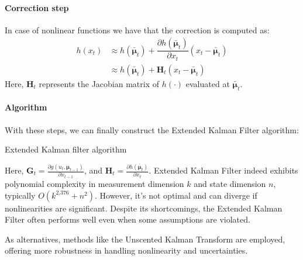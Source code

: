 \paragraph*{Correction step}
In case of nonlinear functions we have that the correction is computed as: 
\begin{align*}
    h(x_t)  &\approx h(\bar{\boldsymbol{\mu}}_t)+\dfrac{\partial h(\bar{\boldsymbol{\mu}}_t)}{\partial x_t}(x_t-\bar{\boldsymbol{\mu}}_t) \\
            &\approx h(\bar{\boldsymbol{\mu}}_t)+\mathbf{H}_t(x_t-\bar{\boldsymbol{\mu}}_t)
\end{align*} 
Here, $\mathbf{H}_t$ represents the Jacobian matrix of $h(\cdot)$ evaluated at $\bar{\boldsymbol{\mu}}_t$. 

\paragraph*{Algorithm}
With these steps, we can finally construct the Extended Kalman Filter algorithm:
\begin{algorithm}[H]
    \caption{Extended Kalman filter algorithm}
        \begin{algorithmic}[1]
             
              
            \State{}
        \end{algorithmic}
\end{algorithm}
Here, $\mathbf{G}_t=\frac{\partial g(u_t,\boldsymbol{\mu}_{t-1})}{\partial x_{t-1}}$, and $\mathbf{H}_t=\frac{\partial h(\bar{\boldsymbol{\mu}}_t)}{\partial x_t}$. 
Extended Kalman Filter indeed exhibits polynomial complexity in measurement dimension $k$ and state dimension $n$, typically $O(k^{2.376} + n^2)$. 
However, it's not optimal and can diverge if nonlinearities are significant. 
Despite its shortcomings, the Extended Kalman Filter often performs well even when some assumptions are violated.

As alternatives, methods like the Unscented Kalman Transform are employed, offering more robustness in handling nonlinearity and uncertainties.